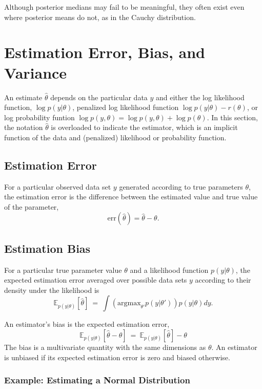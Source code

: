 Although posterior medians may fail to be meaningful, they often exist
even where posterior means do not, as in the Cauchy distribution.



\section{Estimation Error, Bias, and Variance}\label{estimation-bias.section}

An estimate $\hat{\theta}$ depends on the particular data $y$ and
either the log likelihood function, $\log p(y|\theta)$, penalized log
likelihood function $\log p(y|\theta) - r(\theta)$, or log probability
funtion $\log p(y,\theta) = \log p(y,\theta) + \log p(\theta)$.  In
this section, the notation $\hat{\theta}$ is overloaded to indicate
the estimator, which is an implicit function of the data and
(penalized) likelihood or probability function.

\subsection{Estimation Error}

For a particular observed data set $y$ generated according to true
parameters $\theta$, the estimation error is the difference between
the estimated value and true value of the parameter,
\[
\mbox{err}(\hat{\theta}) = \hat{\theta} - \theta.
\]
%

\subsection{Estimation Bias}

For a particular true parameter value $\theta$ and a likelihood
function $p(y|\theta)$, the expected estimation error averaged over
possible data sets $y$ according to their density under the likelihood
is
%
\[
\mathbb{E}_{p(y|\theta)}[\hat{\theta}] 
\ = \
\int \left( \mbox{argmax}_{\theta'} p(y|\theta') \right) p(y|\theta) dy.
\]

An estimator's bias is the expected estimation error,
%
\[
\mathbb{E}_{p(y|\theta)}[\hat{\theta} - \theta]
\ = \
\mathbb{E}_{p(y|\theta)}[\hat{\theta}] - \theta
\]
%
The bias is a multivariate quantity with the same dimensions as
$\theta$.  An estimator is unbiased if its expected estimation error
is zero and biased otherwise.

\subsubsection{Example: Estimating a Normal Distribution}

